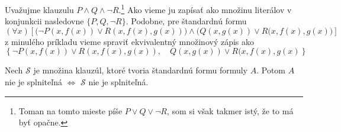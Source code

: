 \begin{priklad}
    Uvažujme klauzulu $P \land Q \land \neg R$.\footnote{
    Toman na tomto mieste píše $P \lor Q \lor \neg R$, som si však
    takmer istý, že to má byť opačne.
    }
    Ako vieme ju zapísať ako
    množinu literálov v konjunkcii nasledovne
    $\{P, Q, \neg R\}$.
    Podobne, pre štandardnú formu
    \begin{equation*}
        (\forall x) \left[
            \Big(\neg P(x,f(x)) \lor R(x,f(x),g(x)) \Big) \land
            \Big( Q(x,g(x))\lor R(x,f(x),g(x) \Big) \right]
    \end{equation*}
    z minulého príkladu vieme spraviť ekvivalentný množinový zápis ako
    \begin{equation*}
        \left\{
            \neg P(x,f(x)) \lor R(x,f(x),g(x)), \quad
            Q(x,g(x))\lor R(x,f(x),g(x) 
        \right\}
    \end{equation*}
\end{priklad}

\begin{veta}
    Nech $\mathscr{S}$ je množina klauzúl, ktoré tvoria štandardnú
    formu formuly $A$. Potom $A$ nie je splniteľná $\iff$ $\mathscr{S}$
    nie je splniteľná.
\end{veta}

